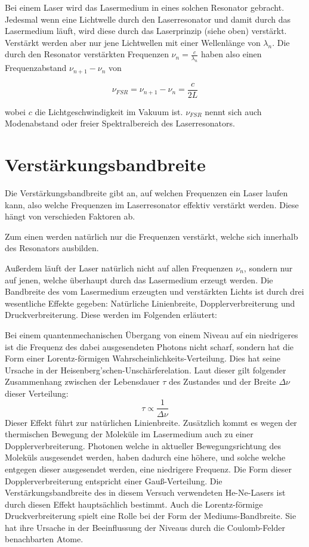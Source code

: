 \documentclass[bigchapter,colorback,accentcolor=tud4b,linedtoc,11pt]{tudreport}
\numberwithin{equation}{subsection}
\begin{document}
Bei einem Laser wird das Lasermedium in eines solchen Resonator gebracht. Jedesmal wenn eine Lichtwelle durch den Laserresonator und damit durch das Lasermedium läuft, wird diese durch das Laserprinzip (siehe oben) verstärkt. Verstärkt werden aber nur jene Lichtwellen mit einer Wellenlänge von \(\lambda_n\). Die durch den Resonator verstärkten Frequenzen \(\nu_n = \frac{c}{\lambda_n}\) haben also einen Frequenzabstand $\nu_{n+1} - \nu_n$ von

$$ \nu_{FSR} = \nu_{n+1} - \nu_n = \frac{c}{2L} $$

wobei $c$ die Lichtgeschwindigkeit im Vakuum ist. $\nu_{FSR}$ nennt sich auch Modenabstand oder freier Spektralbereich des Laserresonators.

\section{Verstärkungsbandbreite}

Die Verstärkungsbandbreite gibt an, auf welchen Frequenzen ein Laser laufen kann, also welche Frequenzen im Laserresonator effektiv verstärkt werden. Diese hängt von verschieden Faktoren ab.

Zum einen werden natürlich nur die Frequenzen verstärkt, welche sich innerhalb des Resonators ausbilden.

Außerdem läuft der Laser natürlich nicht auf allen Frequenzen $\nu_n$, sondern nur auf jenen, welche überhaupt durch das Lasermedium erzeugt werden. Die Bandbreite des vom Lasermedium erzeugten und verstärkten Lichts ist durch drei wesentliche Effekte gegeben: Natürliche Linienbreite, Dopplerverbreiterung und Druckverbreiterung. Diese werden im Folgenden erläutert:

Bei einem quantenmechanischen Übergang von einem Niveau auf ein niedrigeres ist die Frequenz des dabei ausgesendeten Photons nicht scharf, sondern hat die Form einer Lorentz-förmigen Wahrscheinlichkeits-Verteilung. Dies hat seine Ursache in der Heisenberg'schen-Unschärferelation. Laut dieser gilt folgender Zusammenhang zwischen der Lebensdauer $\tau$ des Zustandes und der Breite $\Delta\nu$ dieser Verteilung:
$$ \tau \propto \frac{1}{\Delta\nu} $$
Dieser Effekt führt zur natürlichen Linienbreite.
Zusätzlich kommt es wegen der thermischen Bewegung der Moleküle im Lasermedium auch zu einer Dopplerverbreiterung. Photonen welche in aktueller Bewegungsrichtung des Moleküls ausgesendet werden, haben dadurch eine höhere, und solche welche entgegen dieser ausgesendet werden, eine niedrigere Frequenz. Die Form dieser Dopplerverbreiterung entspricht einer Gauß-Verteilung. Die Verstärkungsbandbreite des in diesem Versuch verwendeten He-Ne-Lasers ist durch diesen Effekt hauptsächlich bestimmt.
Auch die Lorentz-förmige Druckverbreiterung spielt eine Rolle bei der Form der Mediums-Bandbreite. Sie hat ihre Ursache in der Beeinflussung der Niveaus durch die Coulomb-Felder benachbarten Atome.
\end{document}
